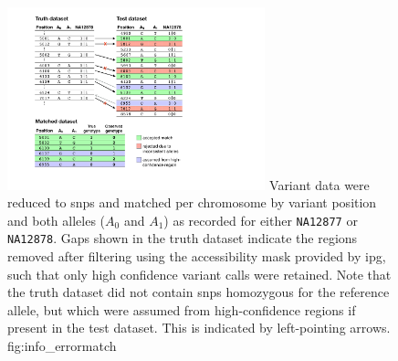 

\begin{figure}[!htb]
\centering
\includegraphics[width=0.666\textwidth]{./img/ch4/info_errormatch}
{Variant data were reduced to \glspl{snp} and matched per chromosome by variant position and both alleles ($A_0$ and $A_1$) as recorded for either \texttt{NA12877} or \texttt{NA12878}.
Gaps shown in the truth dataset indicate the regions removed after filtering using the accessibility mask provided by \gls{ipg}, such that only high confidence variant calls were retained.
Note that the truth dataset did not contain \glspl{snp} homozygous for the reference allele, but which were assumed from high-confidence regions if present in the test dataset.
This is indicated by left-pointing arrows.}
{fig:info_errormatch}
\end{figure}
